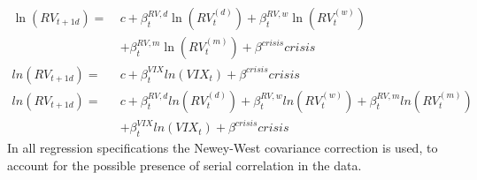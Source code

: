 \begin{align}
\ln(RV_{t+1d}) = \ &c + \beta^{RV,d}_{t} \ln(RV^{(d)}_{t}) + \beta^{RV,w}_{t} \ln(RV^{(w)}_{t}) \nonumber \\
& + \beta^{RV,m}_{t} \ln(RV^{(m)}_{t}) + \beta^{crisis} crisis  \tag{Reg1b}  \label{eq:Reg1b}\\
ln(RV_{t+1d}) =  \ &c + \beta^{VIX}_{t} ln(VIX_{t}) + \beta^{crisis} crisis  \tag{Reg2b}  \label{eq:Reg2b}\\
ln(RV_{t+1d}) = \ &c + \beta^{RV,d}_{t} ln(RV^{(d)}_{t}) + \beta^{RV,w}_{t} ln(RV^{(w)}_{t}) + \beta^{RV,m}_{t} ln(RV^{(m)}_{t}) \nonumber \\
& + \beta^{VIX}_{t} ln(VIX_{t})+ \beta^{crisis} crisis  \tag{Reg3b}  \label{eq:Reg3b}
\end{align}
In all regression specifications the Newey-West covariance correction is used, to account for the possible presence of serial correlation in the data.

